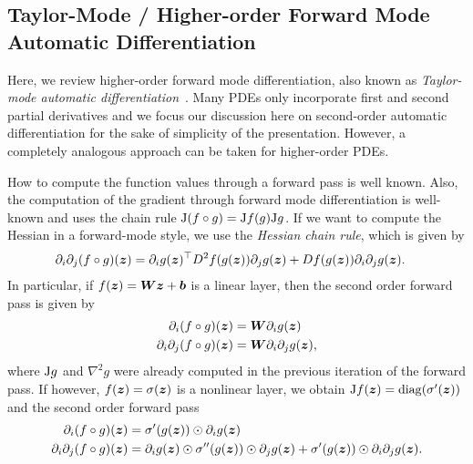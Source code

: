 \subsection{Taylor-Mode  / Higher-order Forward Mode Automatic Differentiation} \label{sec:taylor-mode-AD}

Here, we review higher-order forward mode differentiation, also known as \emph{Taylor-mode automatic differentiation}~\citep{griewank1996algorithm, griewank2008evaluating, bettencourt2019taylor}. 
Many PDEs only incorporate first and second partial derivatives and we focus our discussion here on second-order automatic differentiation for the sake of simplicity of the presentation. 
However, a completely analogous approach can be taken for higher-order PDEs. 

How to compute the function values through a forward pass is well known. 
Also, the computation of the gradient through forward mode differentiation is well-known and uses the chain rule $\mathrm{J} (f\circ g) = \mathrm{J} f (g) \mathrm{J} g$. 
If we want to compute the Hessian in a forward-mode style, we use the \emph{Hessian chain rule}, which is given by 
\begin{align} 
       \partial_i \partial_j (f \circ g)({\bm{z}}) & = \partial_i g({\bm{z}})^\top D^2f(g({\bm{z}}))\partial_j g({\bm{z}}) + Df(g({\bm{z}})) \partial_i \partial_j g({\bm{z}}). 
\end{align}
In particular, if $f({\bm{z}}) = {\bm{W}} {\bm{z}} + {\bm{b}}$ is a linear layer, then the second order forward pass is given by 
\begin{align}
    \partial_i (f\circ g)({\bm{z}}) & = {\bm{W}} \partial_i g({\bm{z}}) \\ 
    \partial_i\partial_j (f\circ g)({\bm{z}}) & = {\bm{W}}   \partial_i\partial_j g({\bm{z}}), 
\end{align}
where $\mathrm{J} g$ and $\nabla^2 g$ were already computed in the previous iteration of the forward pass. 
If however, $f({\bm{z}}) = \sigma({\bm{z}})$ is a nonlinear layer, we obtain $\mathrm{J} f({\bm{z}}) = \operatorname{diag}(\sigma'({\bm{z}}))$ and the second order forward pass 
\begin{align}
    \partial_i (f\circ g)({\bm{z}}) & =  \sigma'(g({\bm{z}})) \odot \partial_i g({\bm{z}})
    \\ 
    \partial_i\partial_j (f\circ g)({\bm{z}}) & = \partial_i g({\bm{z}}) \odot \sigma''(g({\bm{z}})) \odot \partial_j g({\bm{z}}) + \sigma'(g({\bm{z}})) \odot \partial_i \partial_j g({\bm{z}}). 
\end{align}

